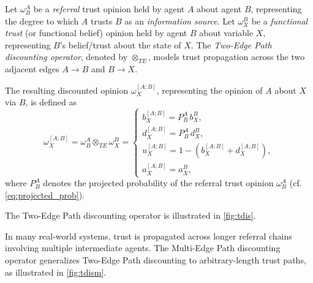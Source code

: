 \begin{definition}
\label{def:two_edge_discounting}

Let $\omega^A_B$ be a \emph{referral} trust opinion held by agent $A$ about agent $B$, representing the degree to which $A$ trusts $B$ as an \emph{information source}. Let $\omega^B_X$ be a \emph{functional trust} (or functional belief) opinion held by agent $B$ about variable $X$, representing $B$'s belief/trust about the state of $X$. The \emph{Two-Edge Path discounting operator}, denoted by $\otimes_{TE}$, models trust propagation across the two adjacent edges $A \rightarrow B$ and $B \rightarrow X$.

The resulting discounted opinion $\omega_X^{[A;B]}$, representing the opinion 
of $A$ about $X$ via $B$, is defined as
\begin{equation}
    \label{equ:td}
    \omega_X^{[A;B]} = \omega^A_B \otimes_{TE} \omega^B_X =
        \begin{cases}
            b^{[A;B]}_X = P^A_B \, b^B_X,\\
            d^{[A;B]}_X = P^A_B \, d^B_X, \\
            u^{[A;B]}_X = 1 - (b^{[A;B]}_X + d^{[A;B]}_X),\\
            a^{[A;B]}_X = a^B_X,
        \end{cases}
\end{equation}
where $P^A_B$ denotes the projected probability of the referral trust opinion 
$\omega^A_B$ (cf. \cref{eq:projected_prob}).

\end{definition}
The Two-Edge Path discounting operator is illustrated in \cref{fig:tdis}.

In many real-world systems, trust is propagated across longer referral chains involving multiple intermediate agents. The Multi-Edge Path discounting operator generalizes Two-Edge Path discounting to arbitrary-length trust paths, as illustrated in \cref{fig:tdism}. 

